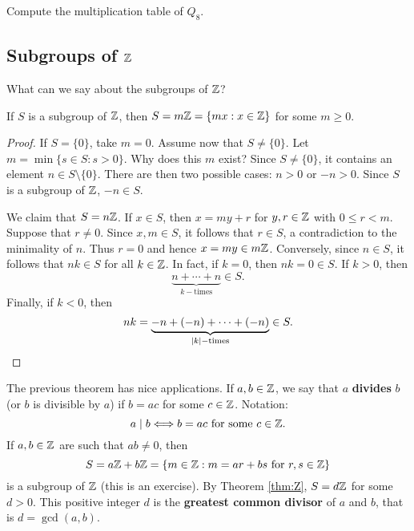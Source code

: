 \begin{exercise}
\label{xca:Q8_table}
    Compute the multiplication table of $Q_8$. 
\end{exercise}

\subsection{Subgroups of $\mathbb{Z}$}

What can we say about the subgroups of $\mathbb{Z}$? 

\begin{theorem}
        \label{thm:Z}
        If $S$ is a subgroup of $\mathbb{Z}$, then
                $S=m\mathbb{Z}=\{mx:x\in \mathbb{Z}\}$
                for some $m\geq0$.
        \end{theorem}
        
        \begin{proof}
                If $S=\{0\}$, take $m=0$. 
                Assume now that $S\ne\{0\}$. Let 
                $m=\min\{s\in S:s>0\}$. 
                Why does this $m$ exist?  
                Since $S\ne\{0\}$,  
                it contains 
                an element $n\in S\setminus\{0\}$. 
                There are then two possible cases: 
                $n>0$ or $-n>0$. Since 
                $S$ is a subgroup of $\mathbb{Z}$, $-n\in S$.
        
                We claim that $S=n\mathbb{Z}$.
                If $x\in S$, then $x=my+r$ for $y,r\in\mathbb{Z}$ with 
                $0\leq r<m$. Suppose that $r\ne 0$. Since $x,m\in S$, it follows that 
                $r\in S$,
                a contradiction to the minimality of $n$. Thus $r=0$ 
                and hence $x=my\in
                m\mathbb{Z}$. Conversely, since $n\in S$, it follows that
                 $nk\in S$ for all $k\in\mathbb{Z}$. In fact, if $k=0$, then 
                 $nk=0\in S$. If $k>0$, 
                 then 
                \[
                \underbrace{n+\cdots+n}_{k-\text{times}}\in S.
                \]
                Finally, if $k<0$, 
                then 
                \[
                nk=\underbrace{-n+(-n)+\cdots+(-n)}_{|k|-\text{times}}\in S.\qedhere
                \]
        \end{proof}

The previous theorem has nice applications. 
If $a,b\in\mathbb{Z}$, we say that $a$ \textbf{divides} $b$ (or $b$ is divisible by $a$)
if $b=ac$ for some $c\in\mathbb{Z}$. Notation: 
\[
a\mid b\Longleftrightarrow b=ac\text{ for some $c\in\mathbb{Z}$.}
\]
If $a,b\in\mathbb{Z}$ are such that $ab\ne0$, then 
\[
S=a\mathbb{Z}+b\mathbb{Z}=\{m\in\mathbb{Z}:m=ar+bs\text{ for $r,s\in\mathbb{Z}$}\}
\]
is a subgroup of $\mathbb{Z}$ (this is an exercise). 
By Theorem \ref{thm:Z}, $S=d\mathbb{Z}$ for some $d>0$. 
This positive integer $d$
is the \textbf{greatest common divisor} of $a$ and $b$, 
that is $d=\gcd(a,b)$. 

